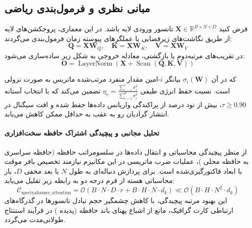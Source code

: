 \subsection{مبانی نظری و فرمول‌بندی ریاضی}
فرض کنید $\mathbf{X} \in \mathbb{R}^{B \times N \times D}$ تانسور ورودی لایه باشد. در این معماری، پروجکشن‌های لایه از طریق نگاشت‌های زیرفضایی یا عملگرهای پیوسته زمان فرمول‌بندی می‌گردند:
 \begin{equation}
\mathbf{Q} = \mathbf{X} \mathbf{W}_Q, \quad \mathbf{K} = \mathbf{X} \mathbf{W}_K, \quad \mathbf{V} = \mathbf{X} \mathbf{W}_V
\end{equation}
در تقریب‌های مرتبه‌دوم یا بازگشتی، معادله خروجی به شکل زیر ساده‌سازی می‌شود:
 \begin{equation}
\mathbf{O} = \operatorname{LayerNorm}\left(\mathbf{X} + \operatorname{Scan}(\mathbf{Q}, \mathbf{K}, \mathbf{V})
\right)
\end{equation}

که در آن $\sigma_i(\mathbf{W})$ بیانگر $i$-امین مقدار منفرد مرتب‌شده ماتریس به صورت نزولی است. نسبت حفظ انرژی طیفی $\eta_r = \frac{\sum_{i=1}^r \sigma_i^2}{\sum_{i=1}^{d} \sigma_i^2}$ تضمین می‌کند که با انتخاب آستانه $\tau \ge 0.90$، بیش از نود درصد از پراکندگی واریانس داده‌ها حفظ شده و افت سیگنال در انتشار گرادیان رو به عقب به حداقل ممکن کاهش می‌یابد.

\paragraph{تحلیل مجانبی و پیچیدگی اشتراک حافظه سخت‌افزاری}
از منظر پیچیدگی محاسباتی و انتقال داده‌ها در سلسومراتب حافظه (حافظه سراسری  به حافظه محلی )، عملیات ضرب ماتریسی در این مکانیزم نیازمند تخصیص بافر موقت با ابعاد فاکتورگیری‌شده است. برای پردازش دنباله‌ای به طول $N$ با بعد مخفی $D$، بار محاسباتی هسته از فرم درجه دو به رابطه زیر تقلیل می‌یابد:
\begin{equation}
\label{eq:complexity_spectraformer_attention}
\mathcal{C}_{\text{spectraformer\_attention}} = \mathcal{O}\left( B \cdot N \cdot D \cdot r + B \cdot H \cdot N \cdot d_k \right) \ll \mathcal{O}\left( B \cdot H \cdot N^2 \cdot d_k \right)
\end{equation}
این بهبود مرتبه پیچیدگی، با کاهش چشمگیر حجم تبادل تانسورها در گذرگاه‌های ارتباطی کارت گرافیک، مانع از اشباع پهنای باند حافظه (پدیده ) در فرآیند استنتاج طولانی‌مدت می‌گردد.
